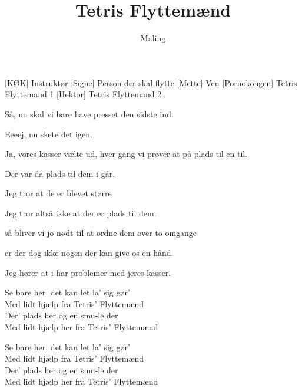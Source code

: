 \documentclass[a4paper,11pt]{article}
\title{Tetris Flyttemænd}
\author{Maling}
\begin{document}
\maketitle

\begin{roles}
[KØK] Instruktør
[Signe] Person der skal flytte
[Mette] Ven
[Pornokongen] Tetris Flyttemand 1
[Hektor] Tetris Flyttemand 2
\end{roles}

\begin{sketch}

 Så, nu skal vi bare have presset den sidste ind.


 Eeeej, nu skete det igen.

 Ja, vores kasser vælte ud, hver gang vi prøver at på plads til en til.

 Der var da plads til dem i går.

 Jeg tror at de er blevet større


 Jeg tror altså ikke at der er plads til dem.

 så bliver vi jo nødt til at ordne dem over to omgange

 er der dog ikke nogen der kan give os en hånd.

 Jeg hører at i har problemer med jeres kasser.


 Se bare her, det kan let la' sig gør' \\ Med lidt hjælp fra Tetris' Flyttemænd \\ Der' plads her og en smu-le der \\ Med lidt hjælp her fra Tetris' Flyttemænd

 Se bare her, det kan let la' sig gør' \\ Med lidt hjælp fra Tetris' Flyttemænd \\ Der' plads her og en smu-le der \\ Med lidt hjælp her fra Tetris' Flyttemænd


\end{sketch}
\end{document}
